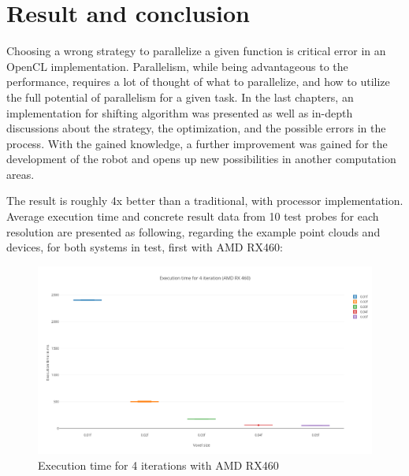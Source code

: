\chapter{Result and conclusion}
Choosing a wrong strategy to parallelize a given function is critical error in an OpenCL implementation. Parallelism, while being advantageous to the performance, requires a lot of thought of what to parallelize, and how to utilize the full potential of parallelism for a given task. In the last chapters, an implementation for shifting algorithm was presented as well as in-depth discussions about the strategy, the optimization, and the possible errors in the process. With the gained knowledge, a further improvement was gained for the development of the robot and opens up new possibilities in another computation areas.

The result is roughly 4x better than a traditional, with processor implementation. Average execution time and concrete result data from 10 test probes for each resolution are presented as following, regarding the example point clouds and devices, for both systems in test, first with AMD RX460:

\begin{figure}[H]
	\centering
	\includegraphics[width=14cm]{images/AllfouriterationRX460.png}
	\caption{Execution time for 4 iterations with AMD RX460}
	\label{ExampleOCTImage}
\end{figure}
\pagebreak

